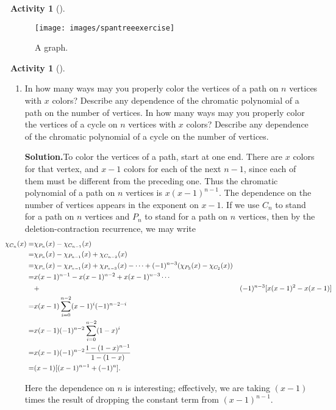 \documentclass[10pt,]{book}
\theoremstyle{plain}
\theoremstyle{definition}
\newtheorem{activity}[project]{Activity}
\numberwithin{equation}{chapter}
\newcommand{\amp}{&}
\begin{document}
\begin{activity}[]
\begin{enumerate}[label=(\alph*)]
\end{enumerate}
\begin{figure}
\centering
\texttt{[image: images/spantreeexercise]}
\caption{A graph.\label{del-cont}}
\end{figure}
\end{activity}
\begin{activity}[]\label{activity-224}
~\par
\begin{enumerate}[label=(\alph*)]
 \item In how many ways may you properly color the vertices of a path on \(n\) vertices with \(x\) colors? Describe any dependence of the chromatic polynomial of a path on the number of vertices. In how many ways may you properly color the vertices of a cycle on \(n\) vertices with \(x\) colors? Describe any dependence of the chromatic polynomial of a cycle on the number of vertices.%
\par\medskip\noindent%
\textbf{Solution.}\quad To color the vertices of a path, start at one end. There are \(x\) colors for that vertex, and \(x-1\) colors for each of the next \(n-1\), since each of them must be different from the preceding one. Thus the chromatic polynomial of a path on \(n\) vertices is \(x(x-1)^{n-1}\). The dependence on the number of vertices appears in the exponent on \(x-1\). If we use \(C_n\) to stand for a path on \(n\) vertices and \(P_n\) to stand for a path on \(n\) vertices, then by the deletion-contraction recurrence, we may write%
\begin{align*}
\hspace{-.4 in}\chi_{C_n}(x)  =\amp
\chi_{P_n}(x)-\chi_{C_{n-1}}(x)\\
=\amp \chi_{P_n}(x)-\chi_{P_{n-1}}(x)+\chi_{C_{n-2}}(x)\\
=\amp
\chi_{P_n}(x)-\chi_{P_{n-1}}(x)+\chi_{P_{n-3}}(x)-
\cdots+(-1)^{n-3}(\chi_{P_3}(x)-\chi_{C_2}(x))\\
=\amp x(x-1)^{n-1}-x(x-1)^{n-2}+x(x-1)^{n-3}\cdots\\
\amp +\amp (-1)^{n-3}[x(x-1)^2-x(x-1)]\\
=\amp x(x-1)\sum_{i=0}^{n-2}(x-1)^i(-1)^{n-2-i}\\
=\amp x(x-1)(-1)^{n-2}\sum_{i=0}^{n-2}(1-x)^i\\
=\amp x(x-1)(-1)^{n-2}\frac{1-(1-x)^{n-1}}{1-(1-x)}\\
=\amp (x-1)[(x-1)^{n-1}+(-1)^n].
\end{align*}
%
\par
Here the dependence on \(n\) is interesting; effectively, we are taking \((x-1)\) times the result of dropping the constant term from \((x-1)^{n-1}\).%


\end{enumerate}
\end{activity}
\end{document}
